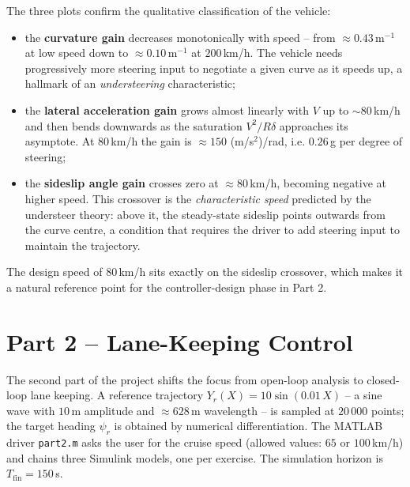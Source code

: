 The three plots confirm the qualitative classification of the
vehicle:
\begin{itemize}
    \item the \textbf{curvature gain} decreases monotonically with
          speed -- from $\approx 0.43$\,m$^{-1}$ at low speed down to
          $\approx 0.10$\,m$^{-1}$ at $200$\,km/h. The vehicle needs
          progressively more steering input to negotiate a given
          curve as it speeds up, a hallmark of an \emph{understeering}
          characteristic;
    \item the \textbf{lateral acceleration gain} grows almost
          linearly with $V$ up to $\sim 80$\,km/h and then bends
          downwards as the saturation $V^2/R\delta$ approaches its
          asymptote. At $80$\,km/h the gain is $\approx 150$
          (m/s$^2$)/rad, i.e. $0.26$\,g per degree of steering;
    \item the \textbf{sideslip angle gain} crosses zero at
          $\approx 80$\,km/h, becoming negative at higher speed.
          This crossover is the \emph{characteristic speed} predicted
          by the understeer theory: above it, the steady-state
          sideslip points outwards from the curve centre, a
          condition that requires the driver to add steering input
          to maintain the trajectory.
\end{itemize}
The design speed of $80$\,km/h sits exactly on the sideslip
crossover, which makes it a natural reference point for the
controller-design phase in Part 2.

\section{Part 2 -- Lane-Keeping Control}
The second part of the project shifts the focus from open-loop
analysis to closed-loop lane keeping. A reference trajectory
$Y_r(X) = 10\sin(0.01\,X)$ -- a sine wave with $10$\,m amplitude and
$\approx 628$\,m wavelength -- is sampled at $20\,000$ points; the
target heading $\psi_r$ is obtained by numerical differentiation. The
MATLAB driver \texttt{part2.m} asks the user for the cruise speed
(allowed values: $65$ or $100$\,km/h) and chains three Simulink
models, one per exercise. The simulation horizon is $T_\mathrm{fin} =
150$\,s.

